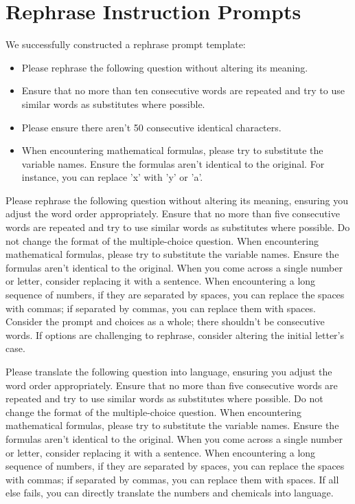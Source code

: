 \section{Rephrase Instruction Prompts}
\label{sec:rephrase-prompt}

We successfully constructed a rephrase prompt template:

\begin{itemize}[noitemsep, topsep=0pt]
    \item Please rephrase the following question without altering its meaning. 
    \item Ensure that no more than ten consecutive words are repeated and try to use similar words as substitutes where possible.
    \item Please ensure there aren't 50 consecutive identical characters.
    \item When encountering mathematical formulas, please try to substitute the variable names. Ensure the formulas aren't identical to the original. For instance, you can replace 'x' with 'y' or 'a'.
\end{itemize}

\vspace{-0.3cm}


\begin{tcolorbox}[title={MMLU Rephrase Instructions}]
Please rephrase the following question without altering its meaning, ensuring you adjust the word order appropriately. 
Ensure that no more than five consecutive words are repeated and try to use similar words as substitutes where possible. Do not change the format of the multiple-choice question.
When encountering mathematical formulas, please try to substitute the variable names. Ensure the formulas aren't identical to the original. 
When you come across a single number or letter, consider replacing it with a sentence. 
When encountering a long sequence of numbers, if they are separated by spaces, you can replace the spaces with commas; if separated by commas, you can replace them with spaces.
Consider the prompt and choices as a whole; there shouldn't be consecutive words. If options are challenging to rephrase, consider altering the initial letter's case.
\end{tcolorbox}

\begin{tcolorbox}[title={MMLU Translate Instructions}]
Please translate the following question into {language}, ensuring you adjust the word order appropriately. 
Ensure that no more than five consecutive words are repeated and try to use similar words as substitutes where possible. Do not change the format of the multiple-choice question.
When encountering mathematical formulas, please try to substitute the variable names. Ensure the formulas aren't identical to the original. 
When you come across a single number or letter, consider replacing it with a sentence. 
When encountering a long sequence of numbers, if they are separated by spaces, you can replace the spaces with commas; if separated by commas, you can replace them with spaces.
If all else fails, you can directly translate the numbers and chemicals into {language}.
\end{tcolorbox}

